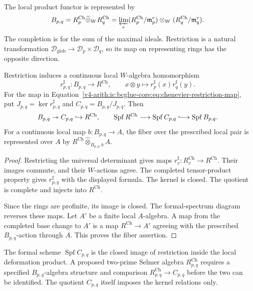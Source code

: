 The local product functor is represented by
\[
 B_{p,q}=R_p^{\mathrm{Ch}}\widehat\otimes_W R_q^{\mathrm{Ch}}
 =\varprojlim_r
 (R_p^{\mathrm{Ch}}/\mathfrak m_p^r)
       \otimes_W(R_q^{\mathrm{Ch}}/\mathfrak m_q^r).
\]
The completion is for the sum of the maximal ideals.
Restriction is a natural transformation
$\mathcal D_{\mathrm{glob}}\to\mathcal D_p\times\mathcal D_q$,
so its map on representing rings has the opposite direction.

\begin{proposition}
\label{v4-arith:ic:bcglue-core:thm:prismatic-nygaard-transition}

Restriction induces a continuous local $W$-algebra homomorphism
\begin{equation}
\label{v4-arith:ic:bcglue-core:eq:chenevier-restriction-map}
 r_{p,q}^{\sharp}:B_{p,q}\longrightarrow R^{\mathrm{Ch}},
 \qquad x\otimes y\longmapsto r_p^{\sharp}(x)r_q^{\sharp}(y).
\end{equation}
For the map in Equation~\eqref{v4-arith:ic:bcglue-core:eq:chenevier-restriction-map},
put $J_{p,q}=\ker r_{p,q}^{\sharp}$ and
$C_{p,q}=B_{p,q}/J_{p,q}$. Then
\[
 B_{p,q}\twoheadrightarrow C_{p,q}\hookrightarrow R^{\mathrm{Ch}},
 \qquad
 \operatorname{Spf}R^{\mathrm{Ch}}\longrightarrow
 \operatorname{Spf}C_{p,q}\lhook\joinrel\longrightarrow
 \operatorname{Spf}B_{p,q}.
\]
For a continuous local map $b:B_{p,q}\to A$, the fiber over the
prescribed local pair is represented over $A$ by
$R^{\mathrm{Ch}}\widehat\otimes_{B_{p,q},b}A$.
\end{proposition}

\begin{proof}
Restricting the universal determinant gives maps
$r_v^{\sharp}:R_v^{\mathrm{Ch}}\to R^{\mathrm{Ch}}$.
Their images commute, and their $W$-actions agree.
The completed tensor-product property gives
$r_{p,q}^{\sharp}$ with the displayed formula.
The kernel is closed. The quotient is complete and injects into
$R^{\mathrm{Ch}}$.

Since the rings are profinite, its image is
closed. The formal-spectrum diagram reverses these maps.
Let $A'$ be a finite local $A$-algebra.
A map from the completed base change to $A'$ is a map
$R^{\mathrm{Ch}}\to A'$ agreeing with the prescribed $B_{p,q}$-action through $A$.
This proves the fiber assertion.
\end{proof}

\begin{definition}
\label{v4-arith:ic:bcglue-core:def:cross-prime-chenevier}
The formal scheme $\operatorname{Spf}C_{p,q}$ is the closed image
of restriction inside the local deformation product.
A proposed two-prime Selmer algebra $R_{p,q}^{\mathrm{Ch}}$
requires a specified $B_{p,q}$-algebra structure and comparison
$R_{p,q}^{\mathrm{Ch}}\to C_{p,q}$ before the two can be identified.
The quotient $C_{p,q}$ itself imposes the kernel relations only.
\end{definition}

